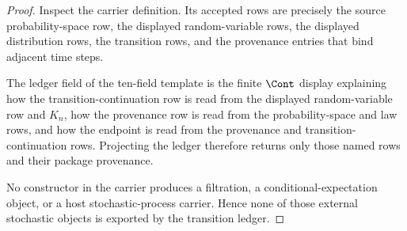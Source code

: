 \begin{proof}
Inspect the carrier definition. Its accepted rows are precisely the source probability-space row, the displayed random-variable rows, the displayed distribution rows, the transition rows, and the provenance entries that bind adjacent time steps.

The ledger field of the ten-field template is the finite $\Cont$ display explaining how the transition-continuation row is read from the displayed random-variable row and $K_n$, how the provenance row is read from the probability-space and law rows, and how the endpoint is read from the provenance and transition-continuation rows. Projecting the ledger therefore returns only those named rows and their package provenance.

No constructor in the carrier produces a filtration, a conditional-expectation object, or a host stochastic-process carrier. Hence none of those external stochastic objects is exported by the transition ledger.
\end{proof}

